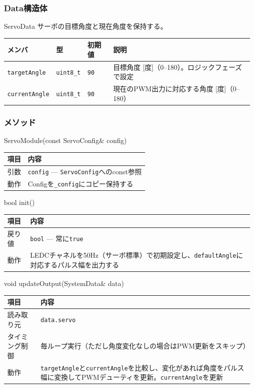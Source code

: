 \subsubsection{Data構造体}

\begin{funcblock}{ServoData}
サーボの目標角度と現在角度を保持する。

\begin{longtable}{l l l p{5.0cm}}
\toprule
\textbf{メンバ} & \textbf{型} & \textbf{初期値} & \textbf{説明} \\
\midrule
\endhead
\texttt{targetAngle}  & \texttt{uint8\_t} & \texttt{90} & 目標角度 [度]（0--180）。ロジックフェーズで設定 \\
\texttt{currentAngle} & \texttt{uint8\_t} & \texttt{90} & 現在のPWM出力に対応する角度 [度]（0--180） \\
\bottomrule
\end{longtable}
\end{funcblock}

\subsubsection{メソッド}

\begin{funcblock}{ServoModule(const ServoConfig\& config)}
\begin{tabularx}{\textwidth}{l X}
\toprule
\textbf{項目} & \textbf{内容} \\
\midrule
引数   & \texttt{config} --- \texttt{ServoConfig}へのconst参照 \\
動作   & Configを\texttt{\_config}にコピー保持する \\
\bottomrule
\end{tabularx}
\end{funcblock}

\begin{funcblock}{bool init()}
\begin{tabularx}{\textwidth}{l X}
\toprule
\textbf{項目} & \textbf{内容} \\
\midrule
戻り値   & \texttt{bool} --- 常に\texttt{true} \\
動作     & LEDCチャネルを50Hz（サーボ標準）で初期設定し、\texttt{defaultAngle}に対応するパルス幅を出力する \\
\bottomrule
\end{tabularx}
\end{funcblock}

\begin{funcblock}{void updateOutput(SystemData\& data)}
\begin{tabularx}{\textwidth}{l X}
\toprule
\textbf{項目} & \textbf{内容} \\
\midrule
読み取り元     & \texttt{data.servo} \\
タイミング制御 & 毎ループ実行（ただし角度変化なしの場合はPWM更新をスキップ） \\
動作           & \texttt{targetAngle}と\texttt{currentAngle}を比較し、変化があれば角度をパルス幅に変換してPWMデューティを更新。\texttt{currentAngle}を更新 \\
\bottomrule
\end{tabularx}
\end{funcblock}

